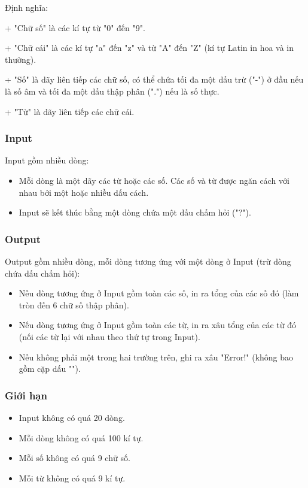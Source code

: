



   Định nghĩa:  

   + "Chữ số" là các kí tự từ "0" đến "9".  

   + "Chữ cái" là các kí tự "a" đến "z" và từ "A" đến "Z" (kí tự Latin in hoa và in thường).  

   + "Số" là dãy liên tiếp các chữ số, có thể chứa tối đa một dấu trừ ("-") ở đầu nếu là số âm và tối đa một dấu thập phân (".") nếu là số thực.  

   + "Từ" là dãy liên tiếp các chữ cái.  



\subsubsection{   Input  }

   Input gồm nhiều dòng:  
\begin{itemize}
	\item     Mỗi dòng là một dãy các từ hoặc các số. Các số và từ được ngăn cách với nhau bởi một hoặc nhiều dấu cách.   
	\item     Input sẽ kết thúc bằng một dòng chứa một dấu chấm hỏi ("?").   
\end{itemize}

\subsubsection{   Output  }

   Output gồm nhiều dòng, mỗi dòng tương ứng với một dòng ở Input (trừ dòng chứa dấu chấm hỏi):  
\begin{itemize}
	\item     Nếu dòng tương ứng ở Input gồm toàn các số, in ra tổng của các số đó (làm tròn đến 6 chữ số thập phân).   
	\item     Nếu dòng tương ứng ở Input gồm toàn các từ, in ra xâu tổng của các từ đó (nối các từ lại với nhau theo thứ tự trong Input).   
	\item     Nếu không phải một trong hai trường trên, ghi ra xâu "Error!" (không bao gồm cặp dấu "").   
\end{itemize}

\subsubsection{   Giới hạn  }
\begin{itemize}
	\item     Input không có quá 20 dòng.   
	\item     Mỗi dòng không có quá 100 kí tự.   
	\item     Mỗi số không có quá 9 chữ số.   
	\item     Mỗi từ không có quá 9 kí tự.   
\end{itemize}

